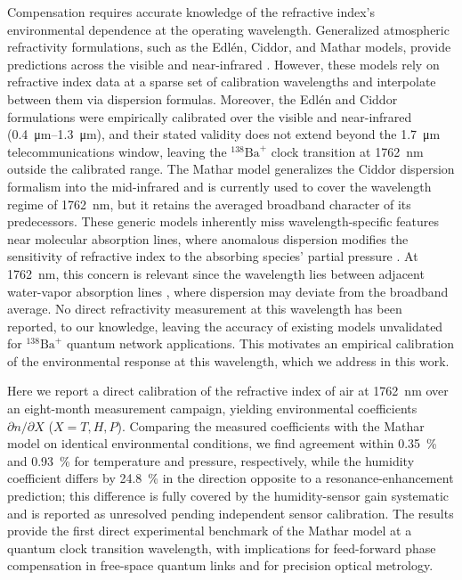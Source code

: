 \documentclass[aps,prapplied,reprint,groupedaddress,twocolumn,superscriptaddress,linenumbers]{revtex4-2}
\begin{document}
Compensation requires accurate knowledge of the refractive index's environmental dependence at the operating wavelength. Generalized atmospheric refractivity formulations, such as the Edl\'{e}n, Ciddor, and Mathar models, provide predictions across the visible and near-infrared \cite{edlen1966refractive,ciddor1996refractive,mathar2007refractive}. However, these models rely on refractive index data at a sparse set of calibration wavelengths and interpolate between them via dispersion formulas. Moreover, the Edl\'{e}n and Ciddor formulations were empirically calibrated over the visible and near-infrared (\SIrange{0.4}{1.3}{\micro\meter}), and their stated validity does not extend beyond the \SI{1.7}{\micro\meter} telecommunications window, leaving the $^{138}\mathrm{Ba}^+$ clock transition at \SI{1762}{\nano\meter} outside the calibrated range. The Mathar model generalizes the Ciddor dispersion formalism into the mid-infrared and is currently used to cover the wavelength regime of \SI{1762}{\nano\meter}, but it retains the averaged broadband character of its predecessors. These generic models inherently miss wavelength-specific features near molecular absorption lines, where anomalous dispersion modifies the sensitivity of refractive index to the absorbing species' partial pressure \cite{hobbs2000introduction}. At \SI{1762}{\nano\meter}, this concern is relevant since the wavelength lies between adjacent water-vapor absorption lines \cite{gordon2022hitran2020}, where dispersion may deviate from the broadband average. No direct refractivity measurement at this wavelength has been reported, to our knowledge, leaving the accuracy of existing models unvalidated for $^{138}\mathrm{Ba}^+$ quantum network applications. This motivates an empirical calibration of the environmental response at this wavelength, which we address in this work.

Here we report a direct calibration of the refractive index of air at \SI{1762}{\nano\meter} over an eight-month measurement campaign, yielding environmental coefficients $\partial n/\partial X$ ($X = T, H, P$). Comparing the measured coefficients with the Mathar model on identical environmental conditions, we find agreement within \SI{0.35}{\percent} and \SI{0.93}{\percent} for temperature and pressure, respectively, while the humidity coefficient differs by \SI{24.8}{\percent} in the direction opposite to a resonance-enhancement prediction; this difference is fully covered by the humidity-sensor gain systematic and is reported as unresolved pending independent sensor calibration. The results provide the first direct experimental benchmark of the Mathar model at a quantum clock transition wavelength, with implications for feed-forward phase compensation in free-space quantum links and for precision optical metrology.
\end{document}
